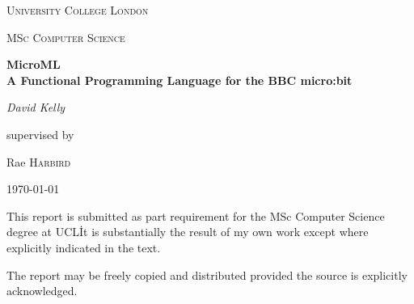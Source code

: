 \documentclass[12pt, a4paper]{report}
\begin{document}
\begin{titlepage}
	\centering
        {\scshape\LARGE University College London\par}
	\vspace{1cm}
        {\scshape\Large MSc Computer Science}
	\vspace{1.5cm}
        {\huge\bfseries MicroML \\ A Functional Programming Language for the BBC micro:bit \par}
	\vspace{2cm}
        {\huge\itshape David Kelly\par}
	\vfill
	supervised by\par
        {\large Rae \textsc{Harbird}}

	\vfill
        {\large \today\par}

        \vfill

        This report is submitted as part requirement for the MSc Computer Science
        degree at UCL\. It is substantially the result of my own work except where 
        explicitly indicated in the text.
        
        \vfill

        The report may be freely copied and distributed provided the source is explicitly
        acknowledged.

\end{titlepage}
\tableofcontents
\newpage
\end{document}
